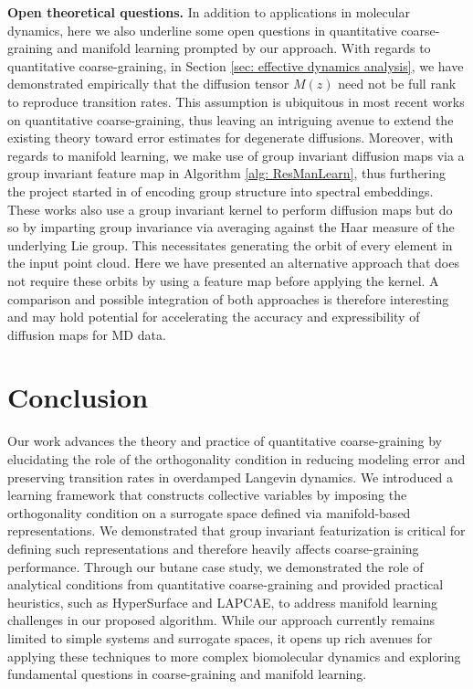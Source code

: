 \documentclass[reqno, 12pt]{article}
\begin{document}
{\bf Open theoretical questions.} In addition to applications in molecular dynamics, here we also underline some open questions in quantitative coarse-graining and manifold learning prompted by our approach. With regards to quantitative coarse-graining, in Section \eqref{sec: effective dynamics analysis}, we have demonstrated empirically that the diffusion tensor $M(z)$ need not be full rank to reproduce transition rates. This assumption is ubiquitous in most recent works on quantitative coarse-graining, thus leaving an intriguing avenue to extend the existing theory toward error estimates for degenerate diffusions. Moreover, with regards to manifold learning, we make use of group invariant diffusion maps via a group invariant feature map in Algorithm \ref{alg: ResManLearn}, thus furthering the project started in \cite{rosen2023g, hoyos2023diffusion} of encoding group structure into spectral embeddings. These works also use a group invariant kernel to perform diffusion maps but do so by imparting group invariance via averaging against the Haar measure of the underlying Lie group. This necessitates generating the orbit of every element in the input point cloud. Here we have presented an alternative approach that does not require these orbits by using a feature map before applying the kernel. A comparison and possible integration of both approaches is therefore interesting and may hold potential for accelerating the accuracy and expressibility of diffusion maps for MD data.  

\section{Conclusion}

Our work advances the theory and practice of quantitative coarse-graining by elucidating the role of the orthogonality condition in reducing modeling error and preserving transition rates in overdamped Langevin dynamics. We introduced a learning framework that constructs collective variables by imposing the orthogonality condition on a surrogate space defined via manifold-based representations. We demonstrated that group invariant featurization is critical for defining such representations and therefore heavily affects coarse-graining performance. Through our butane case study, we demonstrated the role of analytical conditions from quantitative coarse-graining and provided practical heuristics, such as {\sf HyperSurface} and LAPCAE, to address manifold learning challenges in our proposed algorithm. While our approach currently remains limited to simple systems and surrogate spaces, it opens up rich avenues for applying these techniques to more complex biomolecular dynamics and exploring fundamental questions in coarse-graining and manifold learning.
\end{document}
